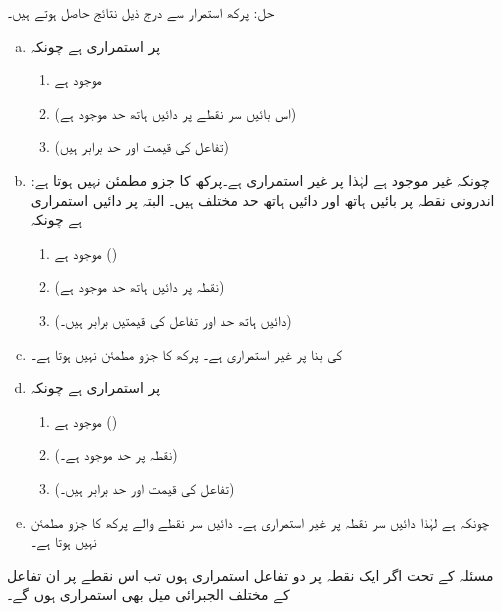 حل:\quad
پرکھ استمرار سے درج ذیل نتائج حاصل ہوتے ہیں۔
\begin{enumerate}[a.]
\item
{} پر  استمراری ہے چونکہ
\begin{enumerate}[1.]
\item
{} موجود ہے 
\item
{} 
\quad\quad
(اس بائیں سر نقطے پر دائیں ہاتھ حد موجود ہے)
\item
{}
\quad\quad
(تفاعل کی قیمت اور حد برابر ہیں)
\end{enumerate}

\item
چونکہ  غیر موجود ہے لہٰذا  پر  غیر استمراری ہے۔پرکھ کا جزو  مطمئن نہیں ہوتا ہے: اندرونی نقطہ  پر بائیں ہاتھ اور دائیں ہاتھ حد مختلف ہیں۔ البتہ  پر  دائیں استمراری ہے چونکہ
\begin{enumerate}[1.]
\item
{} موجود ہے ()
\item
{} (نقطہ  پر دائیں ہاتھ حد موجود ہے)
\item
{} (دائیں ہاتھ حد اور تفاعل کی قیمتیں برابر ہیں۔) 
\end{enumerate}
\item
{} کی بنا  پر  غیر استمراری ہے۔ پرکھ کا جزو  مطمئن نہیں ہوتا ہے۔
\item
{} پر  استمراری ہے چونکہ
\begin{enumerate}[1.]
\item
{} موجود ہے ()
\item
{} (نقطہ  پر حد موجود ہے۔)
\item
{} (تفاعل کی قیمت اور حد برابر ہیں۔)
\end{enumerate}
\item
چونکہ  ہے لہٰذا دائیں سر نقطہ  پر  غیر استمراری ہے۔ دائیں سر نقطے والے پرکھ کا جزو  مطمئن نہیں ہوتا ہے۔  

\end{enumerate}


مسئلہ  کے تحت اگر ایک نقطہ پر دو تفاعل استمراری ہوں تب اس نقطے پر ان تفاعل کے مختلف الجبرائی میل بھی استمراری ہوں گے۔

